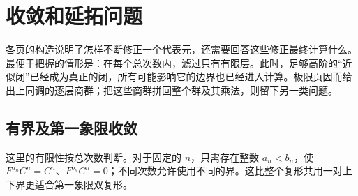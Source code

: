 
% 
% 

\section{收敛和延拓问题}
\label{g2:sec:1004}

各页的构造说明了怎样不断修正一个代表元，还需要回答这些修正最终计算什么。最便于把握的情形是：在每个总次数内，滤过只有有限层。此时，足够高阶的“近似闭”已经成为真正的闭，所有可能影响它的边界也已经进入计算。极限页因而给出上同调的逐层商群；把这些商群拼回整个群及其乘法，则留下另一类问题。

\subsection{有界及第一象限收敛}
\label{g2:subsec:1004:01}

这里的有限性按总次数判断。对于固定的 \(n\)，只需存在整数 \(a_n<b_n\)，使 \(F^{a_n}C^n=C^n\)、\(F^{b_n}C^n=0\)；不同次数允许使用不同的界。这比整个复形共用一对上下界更适合第一象限双复形。

